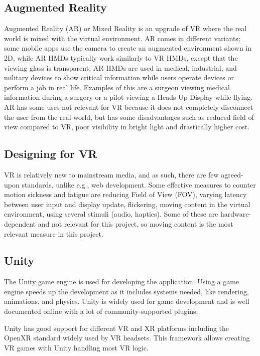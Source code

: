 \documentclass[a4paper]{report}
\begin{document}
\subsection{ Augmented Reality }
Augmented Reality (AR) or Mixed Reality is an upgrade of VR where the real world is mixed with the virtual environment\cite{hackett_three-dimensional_2016}. AR comes in different variants; some mobile apps use the camera to create an augmented environment shown in 2D, while AR HMDs typically work similarly to VR HMDs, except that the viewing glass is transparent.
AR HMDs are used in medical, industrial, and military devices to show critical information while users operate devices or perform a job in real life. Examples of this are a surgeon viewing medical information during a surgery or a pilot viewing a Heads Up Display while flying\cite{mihelj_virtual_2014}.
AR has some uses not relevant for VR because it does not completely disconnect the user from the real world, but has some disadvantages such as reduced field of view compared to VR, poor visibility in bright light\cite{hackett_three-dimensional_2016} and drastically higher cost\cite{medical_holodeck_medicalholodeck_nodate}.

\subsection{Designing for VR}
VR is relatively new to mainstream media, and as such, there are few agreed-upon standards, unlike e.g., web development.
Some effective measures to counter motion sickness and fatigue are reducing Field of View (FOV), varying latency between user input and display update, flickering, moving content in the virtual environment, using several stimuli (audio, haptics)\cite{chang_virtual_2020}. Some of these are hardware-dependent and not relevant for this project, so moving content is the most relevant measure in this project.

\subsection{Unity}

The Unity game engine is used for developing the application\cite{unity}. Using a game engine speeds up the development as it includes systems needed, like rendering, animations, and physics. Unity is widely used for game development\cite{gameenginesonsteam} and is well documented online with a lot of community-supported plugins.

Unity has good support for different VR and XR platforms\cite{unityxr} including the OpenXR standard widely used by VR headsets\cite{openxr}. This framework allows creating VR games with Unity handling most VR logic.
\end{document}
